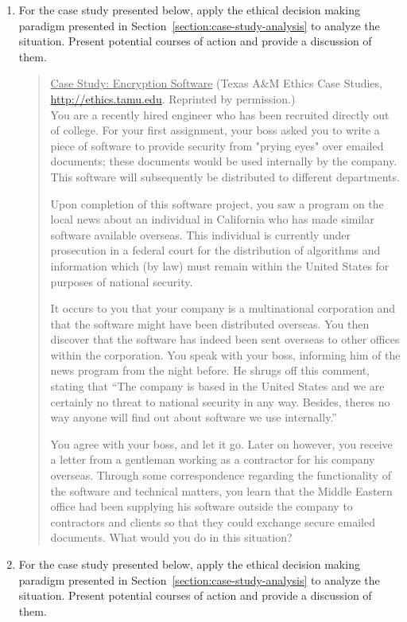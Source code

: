 \begin{enumerate}
\item
  For the case study presented below, apply the ethical decision making
  paradigm presented in Section~\ref{section:case-study-analysis} 
	to analyze the situation. Present
  potential courses of action and provide a discussion of them.

\begin{quote}
\ul{\hfill\break
Case Study: Encryption Software} (Texas A\&M Ethics Case Studies,
\url{http://ethics.tamu.edu}. Reprinted by permission.)\\

You are a recently hired engineer who has been recruited directly out of
college. For your first assignment, your boss asked you to write a piece
of software to provide security from "prying eyes" over e­mailed
documents; these documents would be used internally by the company. This
software will subsequently be distributed to different departments.

Upon completion of this software project, you saw a program on the local
news about an individual in California who has made similar software
available overseas. This individual is currently under prosecution in a
federal court for the distribution of algorithms and information which
(by law) must remain within the United States for purposes of national
security.

It occurs to you that your company is a multinational corporation and
that the software might have been distributed overseas. You then
discover that the software has indeed been sent overseas to other
offices within the corporation. You speak with your boss, informing him
of the news program from the night before. He shrugs off this comment,
stating that ``The company is based in the United States and we are
certainly no threat to national security in any way. Besides,
there\textquotesingle s no way anyone will find out about software we
use internally.''

You agree with your boss, and let it go. Later on however, you receive a
letter from a gentleman working as a contractor for his company
overseas. Through some correspondence regarding the functionality of the
software and technical matters, you learn that the Middle Eastern office
had been supplying his software outside the company to contractors and
clients so that they could exchange secure e­mailed documents. What would
you do in this situation?
\end{quote}


\item
  For the case study presented below, apply the ethical decision making
  paradigm presented in Section~\ref{section:case-study-analysis} 
to analyze the situation. Present
  potential courses of action and provide a discussion of them.


\end{enumerate}
